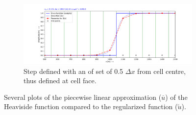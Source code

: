 \begin{figure}[H]
\begin{subfigure}{0.5\textwidth}
    \includegraphics[width=\textwidth]{figures/regul_1d_step_at_0.50_function_dx100.0_cpsi0.125.pdf}
    \caption{Step defined with an of set of  0.5 $\Delta x$ from cell centre, thus defined at cell face.\label{fig:step_dx_offset_0.5dx}}
\end{subfigure}
\caption{Several plots of the piecewise linear approximation ($\overline{u}$) of the Heaviside function compared to the regularized function ($\widetilde{u}$).}
\end{figure}
